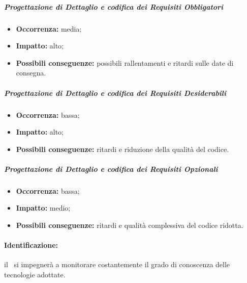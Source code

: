 \documentclass[../PianoProgetto.tex]{subfiles}
\begin{document}
		\subparagraph*{Progettazione di Dettaglio e codifica dei Requisiti Obbligatori}
			\begin{itemize}[label={-}]
				\item \textbf{Occorrenza:} media;
				\item \textbf{Impatto:} alto;
				\item \textbf{Possibili conseguenze:} possibili rallentamenti e ritardi sulle date di consegna.
			\end{itemize}
			
		\subparagraph*{Progettazione di Dettaglio e codifica dei Requisiti Desiderabili}
			\begin{itemize}[label={-}]
				\item \textbf{Occorrenza:} bassa;
				\item \textbf{Impatto:} alto;
				\item \textbf{Possibili conseguenze:} ritardi e riduzione della qualità del codice.
			\end{itemize}
			
		\subparagraph*{Progettazione di Dettaglio e codifica dei Requisiti Opzionali}
			\begin{itemize}[label={-}]
				\item \textbf{Occorrenza:} bassa;
				\item \textbf{Impatto:} medio;
				\item \textbf{Possibili conseguenze:} ritardi e qualità complessiva del codice ridotta.
			\end{itemize}	
			
	
	\paragraph*{Identificazione:} il \responsabilediprogetto\ si impegnerà a monitorare costantemente il grado di conoscenza delle tecnologie adottate.	
	
\end{document}
